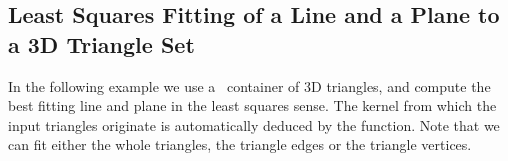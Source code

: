 \subsection{Least Squares Fitting of a Line and a Plane to a 3D Triangle Set}
In the following example we use a \stl\ container of 3D triangles, and compute the best fitting line and plane in the least squares sense. The kernel from which the input triangles originate is automatically deduced by the function. Note that we can fit either the whole triangles, the triangle edges or the triangle vertices.

